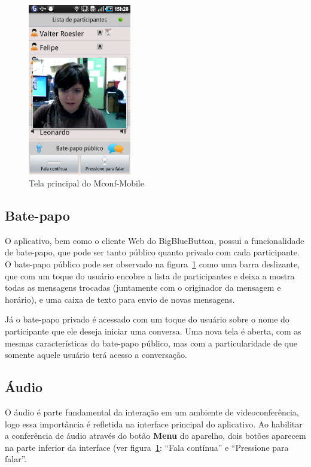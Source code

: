 \documentclass{acm_proc_article-sp}
\begin{document}
\begin{figure}[htp]
\centering
\includegraphics[width=45mm]{app1.png}
\caption{Tela principal do Mconf-Mobile}\label{fig:mconf-mobile}
\end{figure}

\subsection{Bate-papo}

O aplicativo, bem como o cliente Web do BigBlueButton, possui a funcionalidade de bate-papo, que pode ser tanto público quanto privado com cada participante. O bate-papo público pode ser observado na figura~\ref{fig:mconf-mobile} como uma barra deslizante, que com um toque do usuário encobre a lista de participantes e deixa a mostra todas as mensagens trocadas (juntamente com o originador da mensagem e horário), e uma caixa de texto para envio de novas mensagens.

Já o bate-papo privado é acessado com um toque do usuário sobre o nome do participante que ele deseja iniciar uma conversa. Uma nova tela é aberta, com as mesmas características do bate-papo público, mas com a particularidade de que somente aquele usuário terá acesso a conversação.

\subsection{Áudio}

O áudio é parte fundamental da interação em um ambiente de videoconferência, logo essa importância é refletida na interface principal do aplicativo. Ao habilitar a conferência de áudio através do botão \textbf{Menu} do aparelho, dois botões aparecem na parte inferior da interface (ver figura~\ref{fig:mconf-mobile}: ``Fala contínua'' e ``Pressione para falar''.
\end{document}
